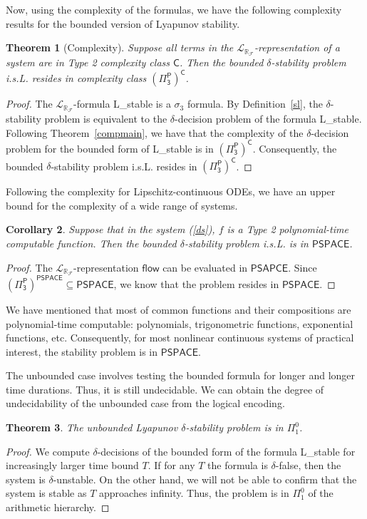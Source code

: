 \documentclass[12pt]{article}
\theoremstyle{plain}
\newtheorem{theorem}{Theorem}[section]
\newtheorem{corollary}[theorem]{Corollary}
\theoremstyle{definition}
\newcommand{\flow}{\mathsf{flow}}
\newcommand{\lrf}{\mathcal{L}_{\mathbb{R}_{\mathcal{F}}}}
\begin{document}
Now, using the complexity of the formulas, we have the following complexity results for the bounded version of Lyapunov stability.
\begin{theorem}[Complexity]
Suppose all terms in the $\lrf$-representation of a system are in Type 2 complexity class $\mathsf{C}$.  Then the bounded $\delta$-stability problem i.s.L. resides in complexity class $\mathsf{(\Pi^P_3)^C}$.
\end{theorem}
\begin{proof}
The $\lrf$-formula {\sf L\_stable} is a $\sigma_3$ formula. By Definition~\ref{sl}, the $\delta$-stability problem is equivalent to the $\delta$-decision problem of the formula {\sf L\_stable}.  Following Theorem~\ref{compmain}, we have that the complexity of the $\delta$-decision problem for the bounded form of {\sf L\_stable} is in $\mathsf{(\Pi^P_3)^C}$. Consequently, the bounded $\delta$-stability problem i.s.L. resides in $\mathsf{(\Pi^P_3)^C}$.
\end{proof}

Following the complexity for Lipschitz-continuous ODEs, we have an upper bound for the complexity of a wide range of systems.
\begin{corollary}
Suppose that in the system (\ref{ds}), $f$ is a Type 2 polynomial-time computable function. Then the bounded $\delta$-stability problem i.s.L. is in $\mathsf{PSPACE}$.
\end{corollary}
\begin{proof}
The $\lrf$-representation $\flow$ can be evaluated in $\mathsf{PSAPCE}$. Since $\mathsf{(\Pi^P_3)^{PSPACE}} \subseteq \mathsf{PSPACE}$, we know that the problem resides in $\mathsf{PSPACE}$.
\end{proof}
We have mentioned that most of common functions and their compositions are polynomial-time computable: polynomials, trigonometric functions, exponential functions, etc. Consequently, for most nonlinear continuous systems of practical interest, the stability problem is in $\mathsf{PSPACE}$.

The unbounded case involves testing the bounded formula for longer and longer time durations. Thus, it is still undecidable. We can obtain the degree of undecidability of the unbounded case from the logical encoding.
\begin{theorem}
The unbounded Lyapunov $\delta$-stability problem is in $\Pi^0_1$.
\end{theorem}
\begin{proof}
We compute $\delta$-decisions of the bounded form of the formula {\sf L\_stable} for increasingly larger time bound $T$. If for any $T$ the formula is $\delta$-false, then the system is $\delta$-unstable. On the other hand, we will not be able to confirm that the system is stable as $T$ approaches infinity. Thus, the problem is in $\Pi^0_1$ of the arithmetic hierarchy. \end{proof}
\end{document}
